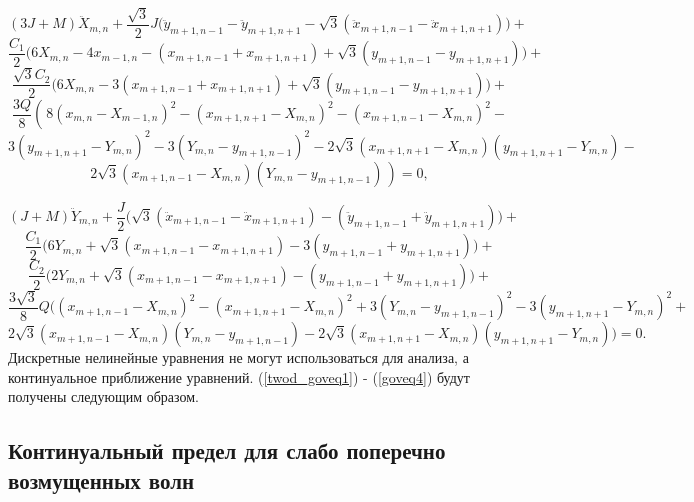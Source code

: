\[
(3J+M)\ddot{X}_{m,n}+\frac{\sqrt{3}}{2}J\Big(\ddot{y}_{m+1,n-1} - \ddot{y}_{m+1,n+1} -\sqrt{3}(\ddot{x}_{m+1,n-1} - \ddot{x}_{m+1,n+1})\Big) +
\]
\[
\frac{C_1}{2}\Big(6X_{m,n} - 4x_{m-1,n} - (x_{m+1,n-1} + x_{m+1,n+1}) + \sqrt{3}(y_{m+1,n-1} - y_{m+1,n+1})\Big) +
\]
\[
\frac{\sqrt{3}C_2}{2}\Big(6X_{m,n} - 3(x_{m+1,n-1} + x_{m+1,n+1}) + \sqrt{3}(y_{m+1,n-1} - y_{m+1,n+1})\Big) +
\]
\[
\frac{3Q}{8}\left(\frac{}{}8(x_{m,n}-X_{m-1,n})^2 - (x_{m+1,n+1} - X_{m,n})^2 - (x_{m+1,n-1} - X_{m,n})^2 - \right.
\]
\[
\left. 3(y_{m+1,n+1} - Y_{m,n})^2 - 3(Y_{m,n} - y_{m+1,n-1})^2-
2\sqrt{3}(x_{m+1,n+1} - X_{m,n})(y_{m+1,n+1} - Y_{m,n}) - \right.
\]
\begin{equation}
	\left. 2\sqrt{3}(x_{m+1,n-1} - X_{m,n})(Y_{m,n}-y_{m+1,n-1})\frac{}{}\right)=0,
	\label{goveq3}
\end{equation}

\[
(J+M)\ddot{Y}_{m,n}+\frac{J}{2}\Big(\sqrt{3}(\ddot{x}_{m+1,n-1} - \ddot{x}_{m+1,n+1}) - (\ddot{y}_{m+1,n-1} + \ddot{y}_{m+1,n+1})\Big) +
\]
\[
\frac{C_1}{2}\Big(6Y_{m,n} + \sqrt{3}(x_{m+1,n-1} - x_{m+1,n+1}) - 3(y_{m+1,n-1} + y_{m+1,n+1})\Big) +
\]
\[
\frac{C_2}{2}\Big(2Y_{m,n}+ \sqrt{3}(x_{m+1,n-1} - x_{m+1,n+1}) - (y_{m+1,n-1} + y_{m+1,n+1})\Big) +
\]
\[
\frac{3\sqrt{3}}{8}Q\Big((x_{m+1,n-1} - X_{m,n})^2 - (x_{m+1,n+1} - X_{m,n})^2 +3(Y_{m,n} - y_{m+1,n-1})^2 - 3(y_{m+1,n+1}-Y_{m,n})^2 +
\]
\begin{equation}
	2\sqrt{3}(x_{m+1,n-1} - X_{m,n})(Y_{m,n} - y_{m+1,n-1}) - 2\sqrt{3}(x_{m+1,n+1} - X_{m,n})(y_{m+1,n+1}-Y_{m,n})\Big)=0. 
	\label{goveq4}
\end{equation}
Дискретные нелинейные уравнения не могут использоваться для анализа, а континуальное приближение уравнений. (\ref{twod_goveq1}) - (\ref{goveq4}) будут получены следующим образом.

\subsection{Континуальный предел для слабо поперечно возмущенных волн}

